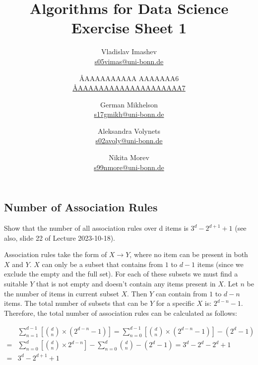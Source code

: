 \documentclass{article}
\title{Algorithms for Data Science \\ Exercise Sheet 1}
\author{
  Vladislav Imashev \\ \href{mailto:s05vimas@uni-bonn.de}{s05vimas@uni-bonn.de} \and
  \AA{AAAAAAAAAA AAAAAAA}{6} \\ \href{mailto:\AA{AAAAAAAAAAAAAAAAAAAA}{7}}{\AA{AAAAAAAAAAAAAAAAAAAA}{7}} \and
  German Mikhelson \\ \href{mailto:s17gmikh@uni-bonn.de}{s17gmikh@uni-bonn.de} \and
  Aleksandra Volynets \\ \href{mailto:s02avoly@uni-bonn.de}{s02avoly@uni-bonn.de} \and
  Nikita Morev \\ \href{mailto:s99nmore@uni-bonn.de}{s99nmore@uni-bonn.de}
}
\begin{document}
  \maketitle

  \setcounter{section}{1}
  \subsection{Number of Association Rules}
  \begin{centerframebox}
    Show that the number of all association rules over d items is $3^d - 2^{d+1} + 1$
    (see also, slide 22 of Lecture 2023-10-18).
  \end{centerframebox}
  Association rules take the form of $X \to Y$, where no item can be present in both $X$ and $Y$. $X$ can only be a subset that contains from $1$ to $d-1$ items (since we exclude the empty and the full set).
  For each of these subsets we must find a suitable $Y$ that is not empty and doesn't contain any items present in $X$.
  Let $n$ be the number of items in current subset $X$. Then $Y$ can contain from $1$ to $d-n$ items.
  The total number of subsets that can be $Y$ for a specific $X$ is: $2^{d-n} - 1$.
  Therefore, the total number of association rules can be calculated as follows:

  \begin{align*}
    &\sum_{n=1}^{d-1} {\left[\binom {d} {n}  \times \left({2} ^ {d-n} -1 \right) \right] = \sum_{n=0}^{d-1} {\left[\binom {d} {n} \times ( {2} ^ {d-n} -1) \right] - \left({2} ^ {d} -1 \right)}}  \\
    =& \sum_{n=0}^{d} {\left[\binom {d} {n} \times {2} ^ {d-n} \right] - \sum_{n=0}^{d} {\binom {d} {n} -} \left({2} ^ {d} -1 \right)} = {3} ^ {d} - {2} ^ {d} - {2} ^ {d} +1  \\
    =& {3} ^ {d} - {2} ^ {d +1} +1 \\
  \end{align*}
\end{document}

